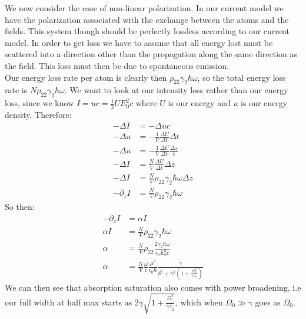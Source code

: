 We now consider the case of non-linear polarization. In our current model we have the polarization associated with the exchange between the atoms and the fields. This system though should be perfectly lossless according to our current model.
In order to get loss we have to assume that all energy lost must be scattered into a direction other than the propagation along the same direction as the field. This loss must then be due to spontaneous emission.\\
Our energy loss rate per atom is clearly then $\rho_{22}\gamma_2\hbar\omega$, so the total energy loss rate is $N\rho_{22}\gamma_2\hbar\omega$.
We want to look at our intensity loss rather than our energy loss, since we know $I = uc =\frac{1}{2} UE_0^2 c$ where $U$ is our energy and $u$ is our energy density. Therefore:
\begin{align*}
	-\Delta I &= -\Delta u c \\
	-\Delta u &= -\frac{1}{V} \frac{\Delta U}{\Delta t}\Delta t \\
	-\Delta u &= -\frac{1}{V} \frac{\Delta U}{\Delta t}\frac{\Delta z}{c} \\
	-\Delta I &= \frac{N}{V} \frac{\Delta U}{\Delta t}\Delta z \\
	-\Delta I &= \frac{N}{V} \rho_{22}\gamma_2\hbar\omega\Delta z \\
	-\partial_z I &= \frac{N}{V} \rho_{22}\gamma_2\hbar\omega
\end{align*}
So then:
\begin{align*}
	-\partial_z I &= \alpha I \\
	\alpha I &= \frac{N}{V} \rho_{22}\gamma_2\hbar\omega\\
	\alpha &= \frac{N}{V} \rho_{22}\frac{2\gamma_2\hbar\omega}{\epsilon_0E_0^2 c}\\
	\alpha &= \frac{N}{V} \frac{\omega}{c} \frac{\mu^2}{\epsilon_0\hbar} \frac{\gamma}{\delta^2 + \gamma^2\left(1 + \frac{\Omega_0^2}{\gamma\gamma_2}\right)} 
\end{align*}
We can then see that absorption saturation also comes with power broadening, i.e our full width at half max starts as $2\gamma\sqrt{1+ \frac{\Omega_)^2}{\gamma\gamma_2}}$, which when $\Omega_0 \gg \gamma$ goes as $\Omega_0$.
